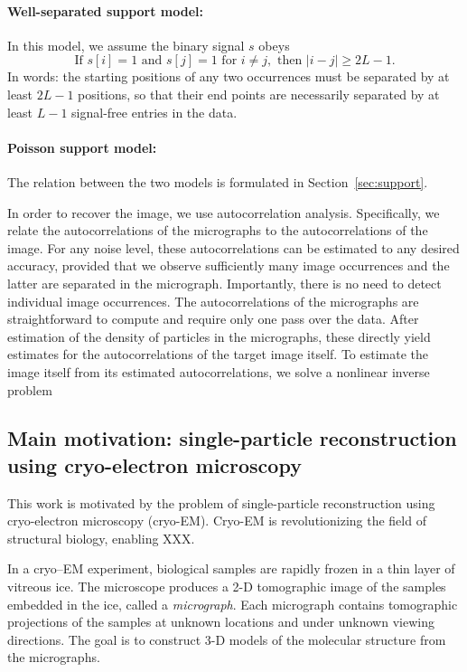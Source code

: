 \documentclass[12pt]{article}
\newcommand{\1}{\mathbf{1}}
\newcommand{\TODO}[1]{{\color{red}{[#1]}}}
\theoremstyle{plain}
\theoremstyle{definition}
\theoremstyle{remark}
\theoremstyle{plain}
\theoremstyle{remark}
\theoremstyle{plain}
\theoremstyle{plain}
\begin{document}
\paragraph{Well-separated support model:} In this model, 
we assume the binary signal $s$ obeys \TODO{This is not accurate}
\begin{equation}
\textrm{If } s[i] = 1 \textrm{ and } s[j] = 1 \textrm{ for } i \neq j, \textrm{ then } |i - j| \geq 2L-1.
\label{eq:spacing}
\end{equation}
In words: the starting positions of any two occurrences  must be separated by at least $2L-1$ positions, so that their end points are necessarily separated by at least $L-1$ signal-free entries in the data.
%
\paragraph{Poisson support model:}

The relation between the two models is formulated in Section~\ref{sec:support}.

In order to recover the image, we use autocorrelation analysis. Specifically, we relate the autocorrelations of the micrographs to the autocorrelations of the image.
For any noise level, these autocorrelations can be estimated to any desired accuracy, provided that we  observe sufficiently many image occurrences and the latter are separated in the micrograph. Importantly, there is no need to detect individual image occurrences. The autocorrelations of the micrographs are straightforward to compute and require only one pass over the data. After estimation of the density of particles in the micrographs, these directly yield estimates for the autocorrelations of the target image itself. To estimate the image itself from its estimated autocorrelations, we solve a nonlinear inverse problem

\subsection{Main motivation: single-particle reconstruction using cryo-electron microscopy}
This work is motivated by the problem of single-particle reconstruction using cryo-electron microscopy (cryo-EM).  Cryo-EM is revolutionizing the field of structural biology, enabling XXX. 

In a cryo--EM experiment, biological samples are rapidly frozen in a thin layer of vitreous ice.
The microscope produces a 2-D tomographic image of the samples embedded in the ice, called a \emph{micrograph}. Each micrograph contains tomographic projections of the samples at unknown locations and under unknown viewing directions. The goal is to construct 3-D models of the molecular structure from the micrographs.
\end{document}
